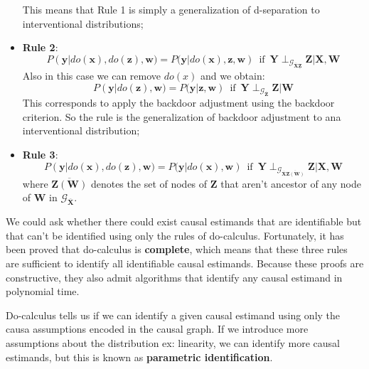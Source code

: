 \begin{definition}
\begin{itemize}
              This means that Rule 1 is simply a generalization of d-separation to
              interventional distributions;
        \item \textbf{Rule 2}:
              \begin{equation}
                  P(\mathbf{y} | do(\mathbf{x}), do(\mathbf{z}), \mathbf{w}) =
                  P(\mathbf{y} | do(\mathbf{x}), \mathbf{z}, \mathbf{w}) \,
                  \text{ if } \, \mathbf{Y} \perp_{\mathcal{G}_{\overline{\mathbf{X}}\underline{\mathbf{Z}}}} \mathbf{Z} | \mathbf{X}, \mathbf{W}
              \end{equation}
              Also in this case we can remove $do(x)$ and we obtain:
              \begin{equation*}
                  P(\mathbf{y} | do(\mathbf{z}), \mathbf{w}) = P(\mathbf{y} | \mathbf{z}, \mathbf{w}) \,
                  \text{ if } \, \mathbf{Y} \perp_{\mathcal{G}_{\overline{\mathbf{Z}}}} \mathbf{Z} | \mathbf{W}
              \end{equation*}
              This corresponds to apply the backdoor adjustment using the backdoor
              criterion. So the rule is the generalization of backdoor adjustment to
              ana interventional distribution;
        \item \textbf{Rule 3}:
              \begin{equation}
                  P(\mathbf{y} | do(\mathbf{x}), do(\mathbf{z}), \mathbf{w}) =
                  P(\mathbf{y} | do(\mathbf{x}), \mathbf{w}) \, \text{ if } \,
                  \mathbf{Y} \perp_{\mathcal{G}_{\overline{\mathbf{X}}\overline{\mathbf{Z}(\mathbf{W})}}} \mathbf{Z} | \mathbf{X}, \mathbf{W}
              \end{equation}
              where $\overline{\mathbf{Z}(\mathbf{W})}$ denotes the set of nodes
              of $\mathbf{Z}$ that aren't ancestor of any node of $\mathbf{W}$
              in $\mathcal{G}_{\overline{\mathbf{X}}}$.
    \end{itemize}
\end{definition}
We could ask whether there could exist causal estimands that are identifiable but
that can't be identified using only the rules of do-calculus. Fortunately, it
has been proved that do-calculus is \textbf{complete}, which means that these
three rules are sufficient to identify all identifiable causal estimands. Because
these proofs are constructive, they also admit algorithms that identify any causal
estimand in polynomial time.

Do-calculus tells us if we can identify a given causal estimand using only the
causa assumptions encoded in the causal graph. If we introduce more assumptions
about the distribution ex: linearity, we can identify more causal estimands, but
this is known as \textbf{parametric identification}.

